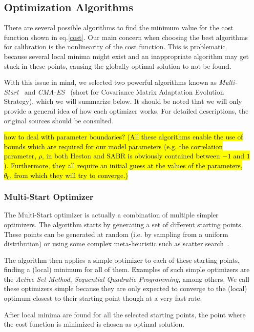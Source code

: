 \subsection{Optimization Algorithms}
There are several possible algorithms to find the minimum value for the cost function shown in eq.\eqref{cost}.
Our main concern when choosing the best algorithms for calibration is the nonlinearity of the cost function. This is problematic because several local minima might exist and an inappropriate algorithm may get stuck in these points, causing the globally optimal solution to not be found.

With this issue in mind, we selected two powerful algorithms known as \emph{Multi-Start}~\cite{Ugray} and \emph{CMA-ES}~\cite{Hansen2} (short for Covariance Matrix Adaptation Evolution Strategy), which we will summarize below. It should be noted that we will only provide a general idea of how each optimizer works. For detailed descriptions, the original sources should be consulted.

\hl{how to deal with parameter boundaries? (All these algorithms enable the use of bounds which are required for our model parameters (e.g. the correlation parameter, $\rho$, in both Heston and SABR is obviously contained between $-1$ and $1$). Furthermore, they all require an initial guess at the values of the parameters, $\theta_0$, from which they will try to converge.)}

\subsubsection{Multi-Start Optimizer}
The Multi-Start optimizer is actually a combination of multiple simpler optimizers.
The algorithm starts by generating a set of different starting points. These points can be generated at random (i.e. by sampling from a uniform distribution) or using some complex meta-heuristic such as scatter search~\cite{Ugray}.

The algorithm then applies a simple optimizer to each of these starting points, finding a (local) minimum for all of them. Examples of such simple optimizers are the \emph{Active Set Method}, \emph{Sequential Quadratic Programming}, among others. We call these optimizers simple because they are only expected to converge to the (local) optimum closest to their starting point though at a very fast rate.

After local minima are found for all the selected starting points, the point where the cost function is minimized is chosen as optimal solution.

